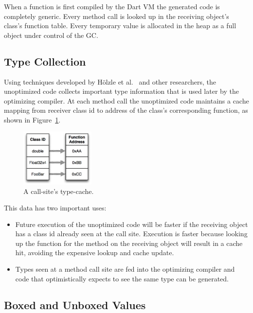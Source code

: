 \documentclass[preprint]{sigplanconf}
\begin{document}
When a function is first compiled by the Dart VM the generated code is
completely generic. Every method call is looked up in the receiving object's
class's function table. Every temporary value is allocated in the heap as a full
object under control of the GC.

\subsection{Type Collection}

Using techniques developed by H\"{o}lzle et al.~\cite{typefeedback} and other
researchers, the unoptimized code collects important type information that is
used later by the optimizing compiler. At each method call the unoptimized code
maintains a cache mapping from receiver class id to address of the
class's corresponding function, as shown in Figure~\ref{fig:typecache}.

\begin{figure}
\begin{center}
\includegraphics[width=0.33\textwidth]{figures/typecache.eps}
\end{center}
\caption{A call-site's type-cache.}
\label{fig:typecache}
\end{figure}

This data has two important uses:
\begin{itemize}
\item
Future execution of the unoptimized code will be faster if the receiving object
has a class id already seen at the call site. Execution is faster because
looking up the function for the method on the receiving object will result in a
cache hit, avoiding the expensive lookup and cache update.

\item
Types seen at a method call site are fed into the optimizing compiler and code
that optimistically expects to see the same type can be generated.
\end{itemize}

\subsection{Boxed and Unboxed Values}
\label{boxing}
\end{document}
